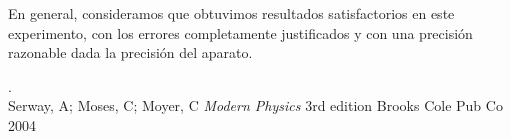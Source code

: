 \documentclass[%
 reprint,
 amsmath,amssymb,
 aps,
]{revtex4-1}
\begin{document}
En general, consideramos que obtuvimos resultados satisfactorios en este experimento, con los errores completamente justificados y con una precisión razonable dada la precisión del aparato.\\

\begin{thebibliography}{99} 
.\\ 
Serway, A; Moses, C; Moyer, C {\it Modern Physics} { 3rd edition} { Brooks Cole Pub Co} { 2004} \\
\\ \end{thebibliography}
\end{document}
